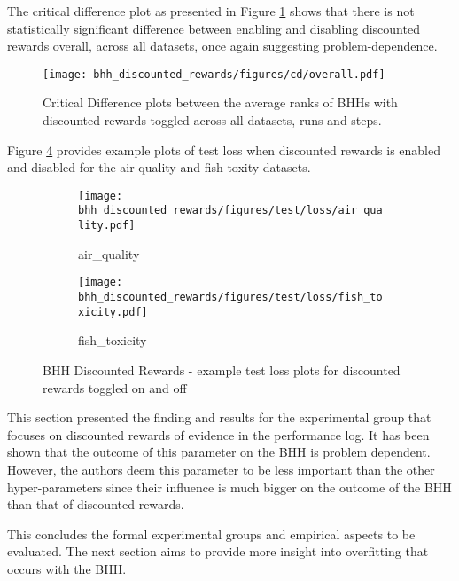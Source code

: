 The critical difference plot as presented in Figure \ref{fig:results:discounted_rewards:descriptive:cd} shows that there is not statistically significant difference between enabling and disabling discounted rewards overall, across all datasets, once again suggesting problem-dependence.

\begin{figure}[htbp]
      \centering
      \texttt{[image: bhh\_discounted\_rewards/figures/cd/overall.pdf]}
      \caption{Critical Difference plots between the average ranks of \Acsp{BHH} with discounted rewards toggled across all datasets, runs and steps.}
      \label{fig:results:discounted_rewards:descriptive:cd}
\end{figure}

Figure \ref{fig:results:discounted_rewards:figures:loss} provides example plots of test loss when discounted rewards is enabled and disabled for the air quality and fish toxity datasets.


\begin{figure}[htbp]
      \begin{subfigure}{0.5\textwidth}
            \centering
            \texttt{[image: bhh\_discounted\_rewards/figures/test/loss/air\_quality.pdf]}
            \caption{air\_quality}
            \label{fig:results:discounted_rewards:figures:loss1}
      \end{subfigure}
      \begin{subfigure}{0.5\textwidth}
            \centering
            \texttt{[image: bhh\_discounted\_rewards/figures/test/loss/fish\_toxicity.pdf]}
            \caption{fish\_toxicity}
            \label{fig:results:discounted_rewards:figures:loss2}
      \end{subfigure}
      \caption{\Acs{BHH} Discounted Rewards - example test loss plots for discounted rewards toggled on and off}
      \label{fig:results:discounted_rewards:figures:loss}
\end{figure}

This section presented the finding and results for the experimental group that focuses on discounted rewards of evidence in the performance log. It has been shown that the outcome of this parameter on the \Ac{BHH} is problem dependent. However, the authors deem this parameter to be less important than the other hyper-parameters since their influence is much bigger on the outcome of the \Ac{BHH} than that of discounted rewards.

This concludes the formal experimental groups and empirical aspects to be evaluated. The next section aims to provide more insight into overfitting that occurs with the \Ac{BHH}.






